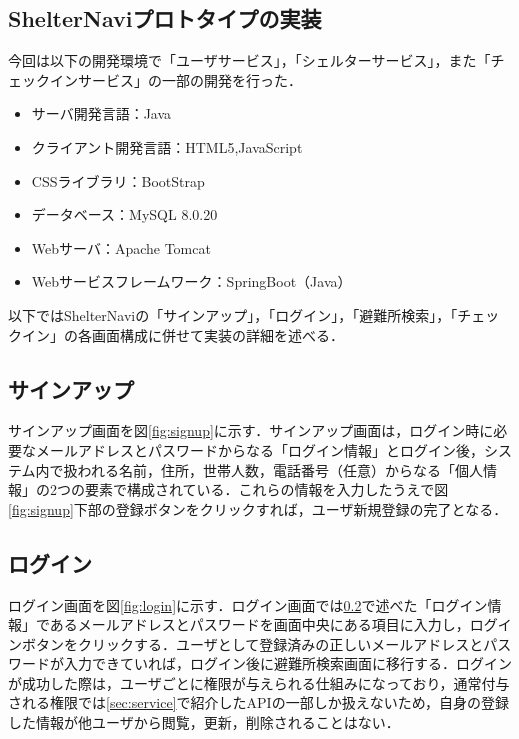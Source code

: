 \documentclass[technicalreport,dvipdfmx]{ieicej}
\begin{document}
\subsection{ShelterNaviプロトタイプの実装}
今回は以下の開発環境で「ユーザサービス」，「シェルターサービス」，また「チェックインサービス」の一部の開発を行った．
\begin{itemize}
    \item サーバ開発言語：Java
    \item クライアント開発言語：HTML5,JavaScript
    \item CSSライブラリ：BootStrap
    \item データベース：MySQL 8.0.20
    \item Webサーバ：Apache Tomcat
    \item Webサービスフレームワーク：SpringBoot（Java）
\end{itemize}
以下ではShelterNaviの「サインアップ」，「ログイン」，「避難所検索」，「チェックイン」の各画面構成に併せて実装の詳細を述べる．

\subsection{サインアップ}
\label{sec:signup}
サインアップ画面を図\ref{fig:signup}に示す．サインアップ画面は，ログイン時に必要なメールアドレスとパスワードからなる「ログイン情報」とログイン後，システム内で扱われる名前，住所，世帯人数，電話番号（任意）からなる「個人情報」の2つの要素で構成されている．これらの情報を入力したうえで図\ref{fig:signup}下部の登録ボタンをクリックすれば，ユーザ新規登録の完了となる．

\subsection{ログイン}
ログイン画面を図\ref{fig:login}に示す．ログイン画面では\ref{sec:signup}で述べた「ログイン情報」であるメールアドレスとパスワードを画面中央にある項目に入力し，ログインボタンをクリックする．ユーザとして登録済みの正しいメールアドレスとパスワードが入力できていれば，ログイン後に避難所検索画面に移行する．ログインが成功した際は，ユーザごとに権限が与えられる仕組みになっており，通常付与される権限では\ref{sec:service}で紹介したAPIの一部しか扱えないため，自身の登録した情報が他ユーザから閲覧，更新，削除されることはない．
\end{document}
